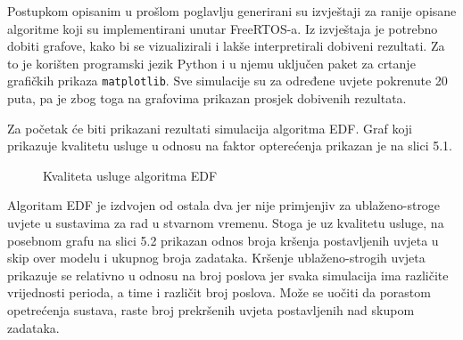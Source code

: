 \documentclass[../zavrsni.tex]{subfiles}
\begin{document}
\sloppy

\justifying

Postupkom opisanim u prošlom poglavlju generirani su izvještaji za ranije opisane algoritme koji su implementirani unutar FreeRTOS-a.
Iz izvještaja je potrebno dobiti grafove, kako bi se vizualizirali i lakše interpretirali dobiveni rezultati. 
Za to je korišten programski jezik Python i u njemu uključen paket za crtanje grafičkih prikaza \texttt{matplotlib}. 
Sve simulacije su za određene uvjete pokrenute 20 puta, pa je zbog toga na grafovima prikazan prosjek dobivenih rezultata. 

Za početak će biti prikazani rezultati simulacija algoritma EDF. Graf koji prikazuje kvalitetu usluge u odnosu na faktor opterećenja 
prikazan je na slici 5.1. 
\begin{figure}[!htb]
    \caption{\label{fig:my-label} Kvaliteta usluge algoritma EDF}
\end{figure}
Algoritam EDF je izdvojen od ostala dva jer nije primjenjiv za ublaženo-stroge
uvjete u sustavima za rad u stvarnom vremenu. Stoga je uz kvalitetu usluge, na posebnom grafu na slici 5.2 prikazan odnos broja kršenja 
postavljenih uvjeta u skip over modelu i ukupnog broja zadataka. Kršenje ublaženo-strogih uvjeta prikazuje se relativno u odnosu na broj 
poslova jer svaka simulacija ima različite vrijednosti perioda, a time i različit broj poslova.
Može se uočiti da porastom opetrećenja sustava, raste broj prekršenih uvjeta postavljenih nad skupom zadataka.
\end{document}
